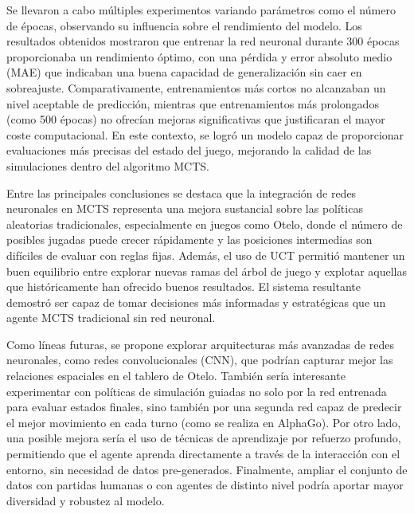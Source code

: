 \documentclass[conference,a4paper]{IEEEtran}
\begin{document}
Se llevaron a cabo múltiples experimentos variando parámetros como el número de épocas, observando su influencia sobre el rendimiento del modelo. Los resultados obtenidos mostraron que entrenar la red neuronal durante 300 épocas proporcionaba un rendimiento óptimo, con una pérdida y error absoluto medio (MAE) que indicaban una buena capacidad de generalización sin caer en sobreajuste. Comparativamente, entrenamientos más cortos no alcanzaban un nivel aceptable de predicción, mientras que entrenamientos más prolongados (como 500 épocas) no ofrecían mejoras significativas que justificaran el mayor coste computacional. En este contexto, se logró un modelo capaz de proporcionar evaluaciones más precisas del estado del juego, mejorando la calidad de las simulaciones dentro del algoritmo MCTS.

Entre las principales conclusiones se destaca que la integración de redes neuronales en MCTS representa una mejora sustancial sobre las políticas aleatorias tradicionales, especialmente en juegos como Otelo, donde el número de posibles jugadas puede crecer rápidamente y las posiciones intermedias son difíciles de evaluar con reglas fijas. Además, el uso de UCT permitió mantener un buen equilibrio entre explorar nuevas ramas del árbol de juego y explotar aquellas que históricamente han ofrecido buenos resultados. El sistema resultante demostró ser capaz de tomar decisiones más informadas y estratégicas que un agente MCTS tradicional sin red neuronal.

Como líneas futuras, se propone explorar arquitecturas más avanzadas de redes neuronales, como redes convolucionales (CNN), que podrían capturar mejor las relaciones espaciales en el tablero de Otelo. También sería interesante experimentar con políticas de simulación guiadas no solo por la red entrenada para evaluar estados finales, sino también por una segunda red capaz de predecir el mejor movimiento en cada turno (como se realiza en AlphaGo). Por otro lado, una posible mejora sería el uso de técnicas de aprendizaje por refuerzo profundo, permitiendo que el agente aprenda directamente a través de la interacción con el entorno, sin necesidad de datos pre-generados. Finalmente, ampliar el conjunto de datos con partidas humanas o con agentes de distinto nivel podría aportar mayor diversidad y robustez al modelo.
\end{document}
